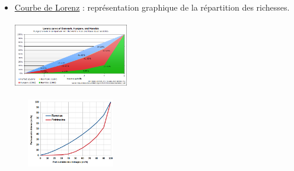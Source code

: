 \documentclass[11pt]{article}
\begin{document}
\begin{itemize}
\item \href{https://fr.wikipedia.org/wiki/Courbe\_de\_Lorenz}{Courbe de Lorenz} : représentation graphique de la répartition des
richesses.

\begin{center}
\includegraphics[width=5cm,height=3cm]{./lorenz-curve.png}
\end{center}

\begin{center}
\includegraphics[width=5cm,height=3cm]{./lorenz-france-2010.png}
\end{center}
\end{itemize}
\end{document}
